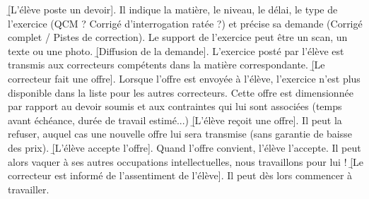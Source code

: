 \begin{enumerate}
\li \b[L'élève poste un devoir]. Il indique la matière, le niveau, le délai, le type de l'exercice (QCM ? Corrigé d'interrogation ratée ?) et précise sa demande (Corrigé complet / Pistes de correction). Le support de l'exercice peut être un scan, un texte ou une photo.
\li \b[Diffusion de la demande]. L'exercice posté par l'élève est transmis aux correcteurs compétents dans la matière correspondante.
\li \b[Le correcteur fait une offre].  Lorsque l'offre est envoyée à l'élève, l'exercice n'est plus disponible dans la liste pour les autres correcteurs. Cette offre est dimensionnée par rapport au devoir soumis et aux contraintes qui lui sont associées (temps avant échéance, durée de travail estimé...)
\li \b[L'élève reçoit une offre]. Il peut la refuser, auquel cas une nouvelle offre lui sera transmise (sans garantie de baisse des prix).
\li \b[L'élève accepte l'offre]. Quand l'offre convient, l'élève l'accepte. Il peut alors vaquer à ses autres occupations intellectuelles, nous travaillons pour lui !
\li \b[Le correcteur est informé de l'assentiment de l'élève]. Il peut dès lors commencer à travailler.
\end{enumerate}